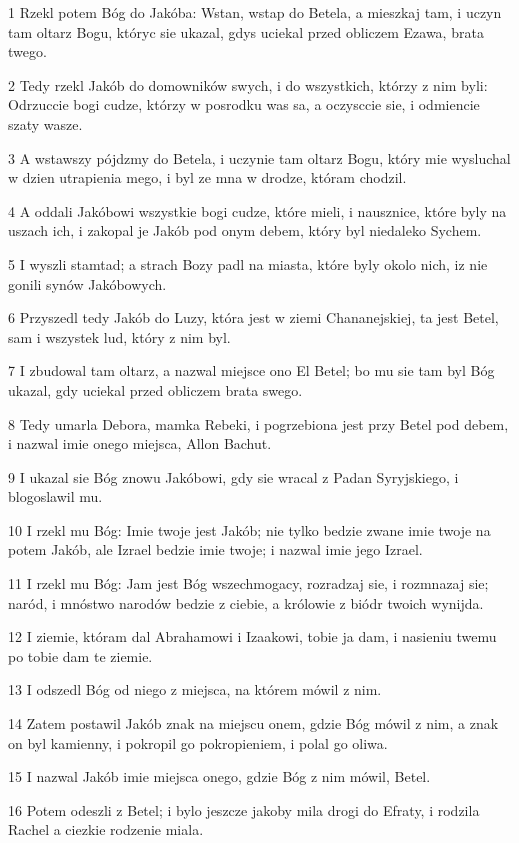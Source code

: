 \par 1 Rzekl potem Bóg do Jakóba: Wstan, wstap do Betela, a mieszkaj tam, i uczyn tam oltarz Bogu, któryc sie ukazal, gdys uciekal przed obliczem Ezawa, brata twego.
\par 2 Tedy rzekl Jakób do domowników swych, i do wszystkich, którzy z nim byli: Odrzuccie bogi cudze, którzy w posrodku was sa, a oczysccie sie, i odmiencie szaty wasze.
\par 3 A wstawszy pójdzmy do Betela, i uczynie tam oltarz Bogu, który mie wysluchal w dzien utrapienia mego, i byl ze mna w drodze, któram chodzil.
\par 4 A oddali Jakóbowi wszystkie bogi cudze, które mieli, i nausznice, które byly na uszach ich, i zakopal je Jakób pod onym debem, który byl niedaleko Sychem.
\par 5 I wyszli stamtad; a strach Bozy padl na miasta, które byly okolo nich, iz nie gonili synów Jakóbowych.
\par 6 Przyszedl tedy Jakób do Luzy, która jest w ziemi Chananejskiej, ta jest Betel, sam i wszystek lud, który z nim byl.
\par 7 I zbudowal tam oltarz, a nazwal miejsce ono El Betel; bo mu sie tam byl Bóg ukazal, gdy uciekal przed obliczem brata swego.
\par 8 Tedy umarla Debora, mamka Rebeki, i pogrzebiona jest przy Betel pod debem, i nazwal imie onego miejsca, Allon Bachut.
\par 9 I ukazal sie Bóg znowu Jakóbowi, gdy sie wracal z Padan Syryjskiego, i blogoslawil mu.
\par 10 I rzekl mu Bóg: Imie twoje jest Jakób; nie tylko bedzie zwane imie twoje na potem Jakób, ale Izrael bedzie imie twoje; i nazwal imie jego Izrael.
\par 11 I rzekl mu Bóg: Jam jest Bóg wszechmogacy, rozradzaj sie, i rozmnazaj sie; naród, i mnóstwo narodów bedzie z ciebie, a królowie z biódr twoich wynijda.
\par 12 I ziemie, któram dal Abrahamowi i Izaakowi, tobie ja dam, i nasieniu twemu po tobie dam te ziemie.
\par 13 I odszedl Bóg od niego z miejsca, na którem mówil z nim.
\par 14 Zatem postawil Jakób znak na miejscu onem, gdzie Bóg mówil z nim, a znak on byl kamienny, i pokropil go pokropieniem, i polal go oliwa.
\par 15 I nazwal Jakób imie miejsca onego, gdzie Bóg z nim mówil, Betel.
\par 16 Potem odeszli z Betel; i bylo jeszcze jakoby mila drogi do Efraty, i rodzila Rachel a ciezkie rodzenie miala.

